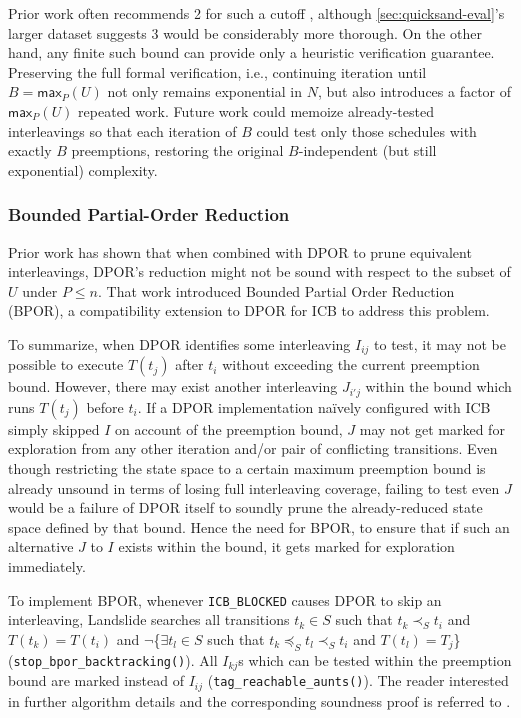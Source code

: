 Prior work often recommends 2 for such a cutoff \cite{chess-icb,smc-empirical-study,dejafu},
although \cref{sec:quicksand-eval}'s larger dataset suggests 3 would be considerably more thorough.
On the other hand, any finite such bound can provide only a heuristic verification guarantee. %
Preserving the full formal verification, i.e., continuing iteration until $B = \mathsf{max}_P(U)$
not only remains exponential in $N$,
but also introduces a factor of $\mathsf{max}_P(U)$ repeated work.
Future work could memoize already-tested interleavings so that each iteration of $B$ could test only
those schedules with exactly $B$ preemptions,
restoring the original $B$-independent (but still exponential) complexity.

\subsubsection{Bounded Partial-Order Reduction}

Prior work \cite{bpor} has shown that
when combined with DPOR to prune equivalent interleavings,
DPOR's reduction might not be sound with respect to the subset of $U$ under $P \le n$.
That work introduced Bounded Partial Order Reduction (BPOR),
a compatibility extension to DPOR for ICB to address this problem.

To summarize, when DPOR identifies some interleaving $I_{ij}$ to test,
it may not be possible to execute $T(t_j)$ after $t_i$ without exceeding the current preemption bound.
However, there may exist another interleaving $J_{i'j}$ within the bound which runs $T(t_j)$ before $t_i$.
If a DPOR implementation na\"ively configured with ICB simply skipped $I$ on account of the preemption bound,
$J$ may not get marked for exploration
from any other iteration and/or pair of conflicting transitions.
Even though restricting the state space to a certain maximum preemption bound is already unsound
in terms of losing full interleaving coverage,
failing to test even $J$ would be a failure of DPOR itself
to soundly prune the already-reduced state space defined by that bound.
Hence the need for BPOR, to ensure that if such an alternative $J$ to $I$ exists within the bound,
it gets marked for exploration immediately.

To implement BPOR,
whenever {\tt ICB\_BLOCKED} causes DPOR to skip an interleaving,
Landslide searches all transitions $t_k \in S$
such that $t_k \prec_S t_i$ and $T(t_k) = T(t_i)$ and
$\neg$\{$\exists t_l \in S$ such that $t_k \preceq_S t_l \prec_S t_i$ and $T(t_l) = T_j$\}
({\tt stop\_bpor\_backtracking()}).
All $I_{kj}$s which can be tested within the preemption bound are marked instead of $I_{ij}$
({\tt tag\_reachable\_aunts()}).
The reader interested in further algorithm details and the corresponding soundness proof is referred to \cite{bpor}.

